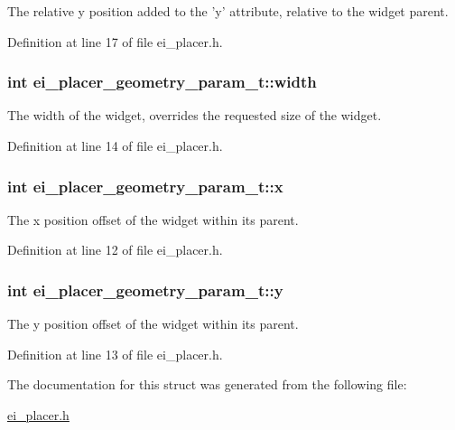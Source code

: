 The relative y position added to the 'y' attribute, relative to the widget parent. 



Definition at line 17 of file ei\+\_\+placer.\+h.

\hypertarget{structei__placer__geometry__param__t_a65101b00a7bb329e4607381014dcfcfb}{
\subsubsection[{width}]{\setlength{\rightskip}{0pt plus 5cm}int ei\+\_\+placer\+\_\+geometry\+\_\+param\+\_\+t\+::width}}\label{structei__placer__geometry__param__t_a65101b00a7bb329e4607381014dcfcfb}


The width of the widget, overrides the requested size of the widget. 



Definition at line 14 of file ei\+\_\+placer.\+h.

\hypertarget{structei__placer__geometry__param__t_a49274771b617cde0726439ed5df76a19}{
\subsubsection[{x}]{\setlength{\rightskip}{0pt plus 5cm}int ei\+\_\+placer\+\_\+geometry\+\_\+param\+\_\+t\+::x}}\label{structei__placer__geometry__param__t_a49274771b617cde0726439ed5df76a19}


The x position offset of the widget within its parent. 



Definition at line 12 of file ei\+\_\+placer.\+h.

\hypertarget{structei__placer__geometry__param__t_abe452e637888cc79b260cf5f6eab5f70}{
\subsubsection[{y}]{\setlength{\rightskip}{0pt plus 5cm}int ei\+\_\+placer\+\_\+geometry\+\_\+param\+\_\+t\+::y}}\label{structei__placer__geometry__param__t_abe452e637888cc79b260cf5f6eab5f70}


The y position offset of the widget within its parent. 



Definition at line 13 of file ei\+\_\+placer.\+h.



The documentation for this struct was generated from the following file\+:\begin{DoxyCompactItemize}
\item 
\hyperlink{ei__placer_8h}{ei\+\_\+placer.\+h}\end{DoxyCompactItemize}

